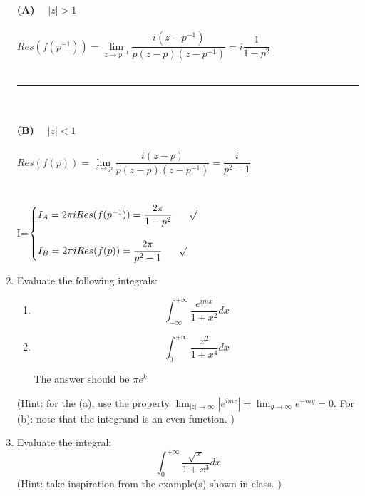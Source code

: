 \documentclass[fleqn]{article}
\begin{document}
\begin{enumerate}
{        \textbf{(A) ~ $|z|>1$}
        \\
        \\
        $
          Res(f(p^{-1}))=\lim\limits_{z \to p^{-1}} \dfrac{i (z-p^{-1})}{p(z-p)(z-p^{-1})}=i\dfrac{1}{1-p^2}
        $
        \\
        \\
        \rule{15cm}{1pt}
        \\
        \\
        \textbf{(B) ~ $|z|<1$}
        \\
        \\
        $
          Res(f(p))=\lim\limits_{z \to p} \dfrac{i (z-p)}{p(z-p)(z-p^{-1})}=\dfrac{i}{p^2-1}
        $
        \\
        \\
        \\
        I=$
          \begin{cases}
            I_A=2 \pi i Res(f(p^{-1}))=\dfrac{2 \pi}{1-p^2} ~~~~~ \surd
            \\
            \\
            I_B=2 \pi i Res(f(p))=\dfrac{2 \pi}{p^2-1} ~~~~~ \surd
          \end{cases}
        $
      }
    
    \item Evaluate the following integrals:
    \begin{enumerate}
      \item $$ \int^{+\infty}_{-\infty} \frac{ e^{imx}}{1+x^2}dx $$ 
      \item $$ \int^{+\infty}_{0} \frac{ x^2}{1+x^4}dx$$
      
      \textcolor{hwColor}{
        The answer should be $\pi e^k$
      }
    \end{enumerate}
    (Hint: for the (a), use the property $\displaystyle\lim_{|z|  \to \infty} |e^{im z}| = \displaystyle\lim_{y  \to \infty} e^{-m y} = 0 $.  For (b): note that the integrand is an even function. ) 
    
    \item Evaluate the integral:
    $$\int^{+\infty}_{0} \frac{ \sqrt{x}}{1+x^3}dx$$
    (Hint: take inspiration from the example(s) shown in class. ) 
    
  \end{enumerate}
\end{document}
